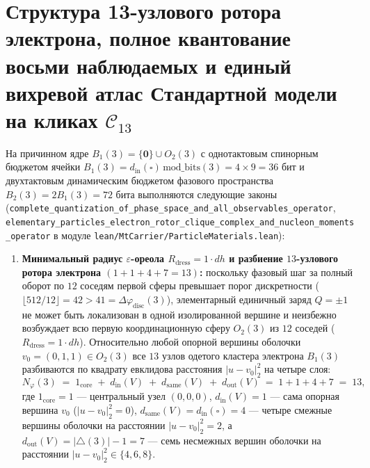 \section{Структура 13-узлового ротора электрона, полное квантование восьми наблюдаемых и единый вихревой атлас Стандартной модели на кликах \texorpdfstring{$\mathcal{C}_{13}$}{C13}}

\begin{theorem}
\label{thm:mono-electron-rotor-quantization}
На причинном ядре $B_1(3) = \{\mathbf{0}\}\cup O_2(3)$ с однотактовым спинорным бюджетом ячейки $B_1(3) = d_{\mathrm{in}}(\square)\,\mathrm{mod\_bits}(3) = 4\times 9 = 36$ бит и двухтактовым динамическим бюджетом фазового пространства $B_2(3) = 2 B_1(3) = 72$ бита выполняются следующие законы (\texttt{complete\_\allowbreak quantization\_\allowbreak of\_\allowbreak phase\_\allowbreak space\_\allowbreak and\_\allowbreak all\_\allowbreak observables\_\allowbreak operator}, \texttt{elementary\_\allowbreak particles\_\allowbreak electron\_\allowbreak rotor\_\allowbreak clique\_\allowbreak complex\_\allowbreak and\_\allowbreak nucleon\_\allowbreak moments\_\allowbreak operator} в модуле \texttt{lean/MtCarrier/ParticleMaterials.lean}):
\begin{enumerate}[label=\textbf{(\arabic*)},leftmargin=*]
\item \textbf{Минимальный радиус $\varepsilon$-ореола $R_{\mathrm{dress}} = 1\cdot dh$ и разбиение $13$-узлового ротора электрона $(1 + 1 + 4 + 7 = 13)$:}
  поскольку фазовый шаг за полный оборот по $12$ соседям первой сферы превышает порог дискретности ($\lfloor 512/12 \rfloor = 42 > 41 = \Delta\varphi_{\mathrm{disc}}(3)$), элементарный единичный заряд $Q = \pm 1$ не может быть локализован в одной изолированной вершине и неизбежно возбуждает всю первую координационную сферу $O_2(3)$ из $12$ соседей ($R_{\mathrm{dress}} = 1\cdot dh$). Относительно любой опорной вершины оболочки $v_0 = (0, 1, 1) \in O_2(3)$ все $13$ узлов одетого кластера электрона $B_1(3)$ разбиваются по квадрату евклидова расстояния $|u - v_0|_2^2$ на четыре слоя:
  \begin{equation}
    \label{eq:mono-electron-13-partition}
    N_\varphi(3) \;=\; 1_{\mathrm{core}} \;+\; d_{\mathrm{in}}(V) \;+\; d_{\mathrm{same}}(V) \;+\; d_{\mathrm{out}}(V) \;=\; 1 + 1 + 4 + 7 \;=\; 13,
  \end{equation}
  где $1_{\mathrm{core}} = 1$ --- центральный узел $(0,0,0)$, $d_{\mathrm{in}}(V) = 1$ --- сама опорная вершина $v_0$ ($|u - v_0|_2^2 = 0$), $d_{\mathrm{same}}(V) = d_{\mathrm{in}}(\square) = 4$ --- четыре смежные вершины оболочки на расстоянии $|u - v_0|_2^2 = 2$, а $d_{\mathrm{out}}(V) = |{\triangle}(3)| - 1 = 7$ --- семь несмежных вершин оболочки на расстоянии $|u - v_0|_2^2 \in \{4, 6, 8\}$.

\end{enumerate}
\end{theorem}
